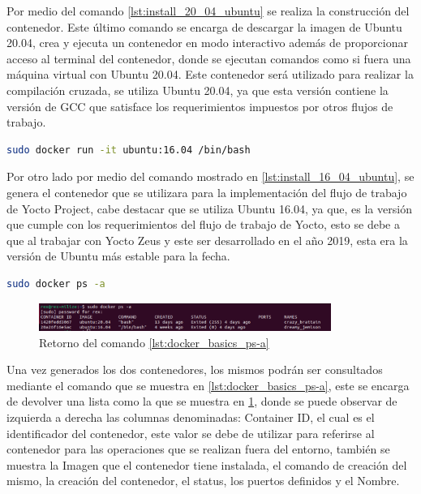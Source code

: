 Por medio del comando \ref{lst:install_20_04_ubuntu} se realiza la construcción del contenedor. Este último comando se encarga de descargar la imagen de Ubuntu 20.04, crea y ejecuta un contenedor en modo interactivo además de proporcionar acceso al terminal del contenedor, donde se ejecutan comandos como si fuera una máquina virtual con Ubuntu 20.04. Este contenedor será utilizado para realizar la compilación cruzada, se utiliza Ubuntu 20.04, ya que esta versión contiene la versión de GCC que satisface los requerimientos impuestos por otros flujos de trabajo.

\begin{lstlisting}[language=bash, caption={Instalacion de Ubuntu 16.04, Linux}, label=lst:install_16_04_ubuntu]
    sudo docker run -it ubuntu:16.04 /bin/bash
\end{lstlisting}

Por otro lado por medio del comando mostrado en \ref{lst:install_16_04_ubuntu}, se genera el contenedor que se utilizara para la implementación del flujo de trabajo de Yocto Project, cabe destacar que se utiliza Ubuntu 16.04, ya que, es la versión que cumple con los requerimientos del flujo de trabajo de Yocto, esto se debe a que al trabajar con Yocto Zeus y este ser desarrollado en el año 2019, esta era la versión de Ubuntu más estable para la fecha. 

\begin{lstlisting}[language=bash, caption={Lista de contenedores del sistema, Docker}, label=lst:docker_basics_ps-a]
    sudo docker ps -a
\end{lstlisting}

\begin{figure}[h!]
    \centering
    \includegraphics[width=0.85\textwidth]{fig/especifico_2/retornos_de_comandos/sudo_docker_ps_a.pdf}
    \caption{Retorno del comando \ref{lst:docker_basics_ps-a}}
    \label{fig:sudo_docker_ps_a}
\end{figure}

Una vez generados los dos contenedores, los mismos podrán ser consultados mediante el comando que se muestra en \ref{lst:docker_basics_ps-a}, este se encarga de devolver una lista como la que se muestra en \ref{fig:sudo_docker_ps_a}, donde se puede observar de izquierda a derecha las columnas denominadas: Container ID, el cual es el identificador del contenedor, este valor se debe de utilizar para referirse al contenedor para las operaciones que se realizan fuera del entorno, también se muestra la Imagen que el contenedor tiene instalada, el comando de creación del mismo, la creación del contenedor, el status, los puertos definidos y el Nombre.


